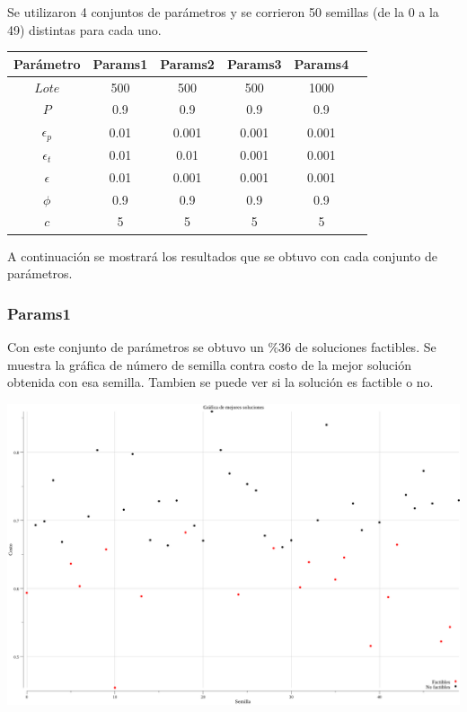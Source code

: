 \documentclass[12pt]{article}
\begin{document}
Se utilizaron 4 conjuntos de parámetros y se corrieron 50 semillas (de la 0 a la 49) distintas para cada uno.

\begin{center}
  \begin{tabular}{ |c||c|c|c|c|c| } 
    \hline
    Parámetro & Params1 & Params2 & Params3 & Params4 \\ [0.5ex] 
    \hline\hline
    $Lote$ & 500 & 500 & 500 & 1000  \\\hline 
    $P$ & 0.9 & 0.9 & 0.9 & 0.9 \\ \hline 
    $\epsilon_p$ & 0.01 & 0.001 & 0.001 & 0.001 \\ \hline 
    $\epsilon_t$ & 0.01 & 0.01 & 0.001 & 0.001 \\ \hline 
    $\epsilon$ & 0.01 & 0.001 & 0.001 & 0.001 \\ \hline 
    $\phi$ & 0.9 & 0.9 & 0.9 & 0.9 \\ \hline 
    $c$ & 5 & 5 & 5 & 5 \\ 
    \hline
  \end{tabular}
\end{center}

A continuación se mostrará los resultados que se obtuvo con cada conjunto de parámetros.

\newpage

\subsubsection*{Params1}
Con este conjunto de parámetros se obtuvo un $\%$36 de soluciones factibles. Se muestra la gráfica de número de semilla contra costo de la mejor solución obtenida con esa semilla. Tambien se puede ver si la solución es factible o no. \\

\begin{center}
  \includegraphics[scale=0.25]{../archivos/graficas/mejores-soluciones/soluciones1.png} \\
\end{center}
  
\end{document}
